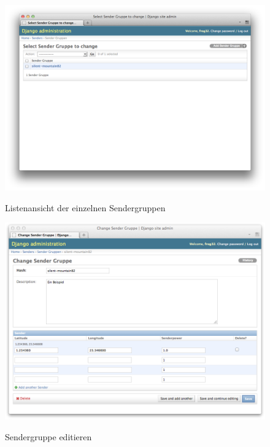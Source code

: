 \begin{figure}[H]
	\centering			      
        \includegraphics[scale=0.35]{images/group-index.png}\\
		\caption{Listenansicht der einzelnen Sendergruppen}
	\label{fig:group-index}
\end{figure}

\begin{figure}[H]
	\centering			      
        \includegraphics[scale=0.35]{images/group-edit.png}\\
		\caption{Sendergruppe editieren}
	\label{fig:group-edit}
\end{figure}

